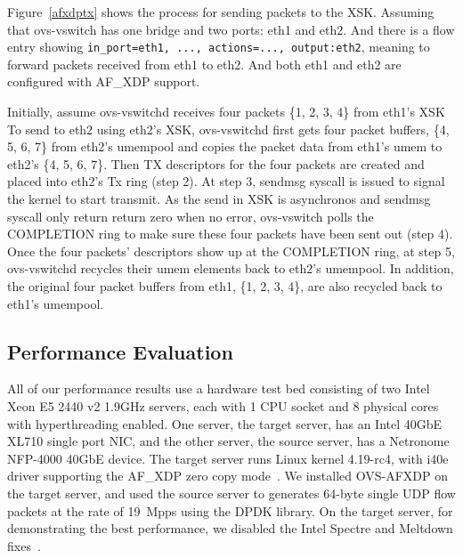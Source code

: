 \documentclass[10pt]{sigplanconf}
\begin{document}
Figure~\ref{afxdptx} shows the process for sending packets to the XSK.
Assuming that ovs-vswitch has one bridge and two ports: eth1 and eth2.
And there is a flow entry showing
\texttt{in\_port=eth1, ..., actions=..., output:eth2}, meaning to forward
packets received from eth1 to eth2.
And both eth1 and eth2 are configured with AF\_XDP support.

Initially, assume ovs-vswitchd receives four packets \{1, 2, 3, 4\} from eth1's XSK
To send to eth2 using eth2's XSK, ovs-vswitchd first gets four packet buffers,
\{4, 5, 6, 7\} from eth2's umempool and copies the packet data from eth1's umem
to eth2's \{4, 5, 6, 7\}.  Then TX descriptors for the four packets are
created and placed into eth2's Tx ring (step 2).
At step 3, sendmsg syscall is issued to signal the kernel to start transmit.
As the send in XSK is asynchronos and sendmsg syscall only return return zero when
no error, ovs-vswitch polls the COMPLETION ring to make sure these four
packets have been sent out (step 4).
Once the four packets' descriptors show up at the COMPLETION ring, at step 5,
ovs-vswitchd recycles their umem elements back to eth2's umempool.
In addition, the original four packet buffers from eth1, \{1, 2, 3, 4\}, are
also recycled back to eth1's umempool.

\subsection{Performance Evaluation}
All of our performance results use a hardware test bed consisting of
two Intel Xeon E5 2440 v2 1.9GHz servers, each with 1 CPU socket and
8 physical cores with hyperthreading enabled.
One server, the target server, has an Intel 40GbE XL710 single port NIC,
and the other server, the source server, has a Netronome NFP-4000 40GbE device.
The target server runs Linux kernel 4.19-rc4, with i40e driver supporting
the AF\_XDP zero copy mode~\cite{af_xdp_patch_i40e, af_xdp_patch_zc}.
We installed OVS-AFXDP on the target server, and used the source server to
generates 64-byte single UDP flow packets
at the rate of 19~Mpps using the DPDK library.
On the target server, for demonstrating the best performance,
we disabled the Intel Spectre and Meltdown fixes~\cite{jesper_xdp_perf_drop, retpoline}.
\end{document}
